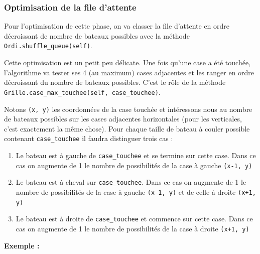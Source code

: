 \subsubsection{Optimisation de la file d'attente}

Pour l'optimisation de cette phase, on va classer la file d'attente en ordre décroissant de nombre de bateaux possibles avec la méthode \texttt{Ordi.shuffle\_queue(self)}.
 
Cette optimisation est un petit peu délicate. Une fois qu'une case a été touchée, l'algorithme va tester ses 4 (au maximum) cases adjacentes et les ranger en ordre décroissant du nombre de bateaux possibles. C'est le rôle de la méthode \texttt{Grille.case\_max\_touchee(self, case\_touchee)}. 

Notons \texttt{(x, y)} les coordonnées de la case touchée et intéressons nous au nombre de bateaux possibles sur les cases adjacentes horizontales (pour les verticales, c'est exactement la même chose). Pour chaque taille de bateau à couler possible contenant \texttt{case\_touchee} il faudra distinguer trois cas :
\begin{enumerate}
\item Le bateau est à gauche de \texttt{case\_touchee} et se termine sur cette case. Dans ce cas on augmente de 1 le nombre de possibilités de la case à gauche \texttt{(x-1, y)}
\item Le bateau est à cheval sur \texttt{case\_touchee}. Dans ce cas on augmente de 1 le nombre de possibilités de la case à gauche \texttt{(x-1, y)} et de celle à droite \texttt{(x+1, y)}
\item Le bateau est à droite de \texttt{case\_touchee} et commence sur cette case. Dans ce cas on augmente de 1 le nombre de possibilités de la case à droite \texttt{(x+1, y)}
\end{enumerate}
\newpage
\textbf{Exemple :}

